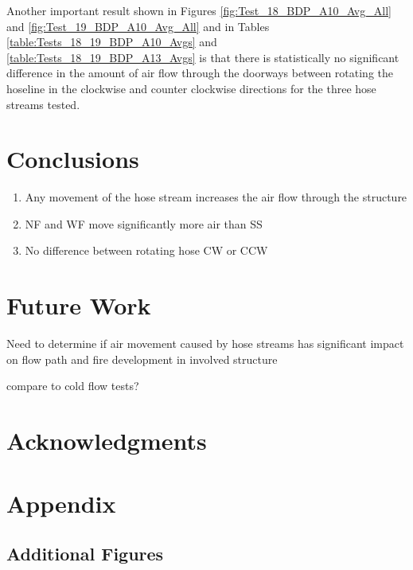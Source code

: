 \documentclass[12pt,oneside]{book}
\begin{document}
Another important result shown in Figures \ref{fig:Test_18_BDP_A10_Avg_All} and \ref{fig:Test_19_BDP_A10_Avg_All} and in Tables \ref{table:Tests_18_19_BDP_A10_Avgs} and \ref{table:Tests_18_19_BDP_A13_Avgs} is that there is statistically no significant difference in the amount of air flow through the doorways between rotating the hoseline in the clockwise and counter clockwise directions for the three hose streams tested. 

%
%

\chapter{Conclusions}
\label{chap:Conclusions}
\begin{enumerate}
\item Any movement of the hose stream increases the air flow through the structure
\item NF and WF move significantly more air than SS
\item No difference between rotating hose CW or CCW
\end{enumerate}

\chapter{Future Work}
\label{chap:Future_Work}
Need to determine if air movement caused by hose streams has significant impact on flow path and fire development in involved structure

compare to cold flow tests?

\chapter{Acknowledgments}
\label{chap:Acknowledgments}



\appendix
\chapter{Appendix}
\label{chap:appendix}

\section{Additional Figures}
\label{sec:additional_figures}

\clearpage
\end{document}
